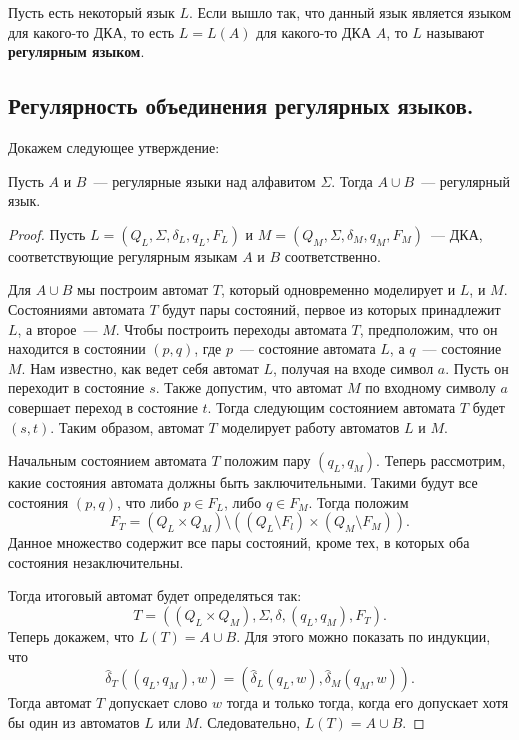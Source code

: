 \documentclass[a4paper,12pt]{article}
\begin{document}
	 Пусть есть некоторый язык $L$. Если вышло так, что данный язык является языком для какого-то ДКА, то есть $L = L(A)$ для какого-то ДКА $A$, то $L$ называют \textbf{регулярным языком}.
	 
	 \subsection{Регулярность объединения регулярных языков.}
	 Докажем следующее утверждение:
	 \begin{theorem}
	 	Пусть $A$ и $B$~--- регулярные языки над алфавитом $\Sigma$. Тогда $A \cup B$~--- регулярный язык.
	 \end{theorem}
	 \begin{proof}
	 	Пусть $L = (Q_L, \Sigma, \delta_L, q_L, F_L)$ и $M = (Q_M, \Sigma, \delta_M, q_M, F_M)$~--- ДКА, соответствующие регулярным языкам $A$ и $B$ соответственно.
	 	
	 	Для $A \cup B$ мы построим автомат $T$, который одновременно моделирует и $L$, и $M$. Состояниями автомата $T$ будут пары состояний, первое из которых принадлежит $L$, а второе~--- $M$. Чтобы построить переходы автомата $T$, предположим, что он находится в состоянии $(p, q)$, где $p$~--- состояние автомата $L$, а $q$~--- состояние $M$. Нам известно, как ведет себя автомат $L$, получая на входе символ $a$. Пусть он переходит в состояние $s$. Также допустим, что автомат $M$ по входному символу $a$ совершает переход в состояние $t$. Тогда следующим состоянием автомата $T$ будет $(s, t)$. Таким образом, автомат $T$ моделирует работу автоматов $L$ и $M$. 
	 	
	 	Начальным состоянием автомата $T$ положим пару $(q_L, q_M)$. Теперь рассмотрим, какие состояния автомата должны быть заключительными. Такими будут все состояния $(p, q)$, что либо $p \in F_L$, либо $q \in F_M$. Тогда положим \[F_T = (Q_L \times Q_M) \setminus ((Q_L \setminus F_l) \times (Q_M \setminus F_M)).\]
	 	Данное множество содержит все пары состояний, кроме тех, в которых оба состояния незаключительны.
	 	
	 	Тогда итоговый автомат будет определяться так:
	 	\[T = ((Q_L \times Q_M), \Sigma, \delta, (q_L, q_M), F_T).\]
	 	Теперь докажем, что $L(T) = A \cup B$. Для этого можно показать по индукции, что \[\hat{\delta}_T((q_L, q_M), w) = (\hat{\delta}_L(q_L, w), \hat{\delta}_M(q_M, w)).\]
	 	Тогда автомат $T$ допускает слово $w$ тогда и только тогда, когда его допускает хотя бы один из автоматов $L$  или $M$. Следовательно, $L(T) = A \cup B$.
	 \end{proof}
	 
\end{document}
